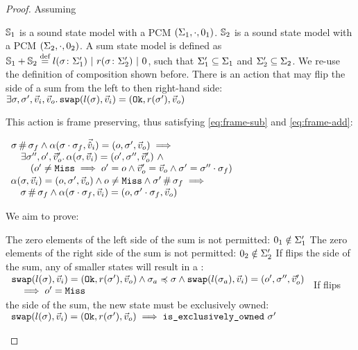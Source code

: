 \begin{proof}


Assuming 
\begin{hypvlist}
 $\mathbb S_1$ is a sound state model with a PCM $(\Sigma_1, \cdot, 0_1)$.
 $\mathbb S_2$ is a sound state model with a PCM $(\Sigma_2, \cdot, 0_2)$.
 A sum state model is defined as $\mathbb S_1 + \mathbb S_2 \stackrel{\textnormal{def}}= l(\sigma\colon \Sigma_1') ~|~ r(\sigma\colon \Sigma_2') ~|~ 0$, such that $\Sigma_1'\subseteq \Sigma_1$ and $\Sigma_2'\subseteq \Sigma_2$. We re-use the definition of composition shown before.
 There is an action \swap{} that may flip the side of a sum from the left to then right-hand side: $\exists\sigma,\sigma',\vec{v}_i,\vec{v}_o\ldotp \texttt{swap}(l(\sigma),\vec{v}_i)=(\texttt{Ok},r(\sigma'),\vec{v}_o)$
\end{hypvlist}

This \swap{} action is frame preserving, thus satisfying \ref{eq:frame-sub} and \ref{eq:frame-add}:
\begin{hypvlist}
	 $\begin{array}{l}
\sigma\operatorname{\#}\sigma_f \land \alpha(\sigma\cdot\sigma_f,\vec{\hat{v}}_i)=(o, \sigma',\vec{v}_o) \implies \\
\quad\exists \sigma'', o', \vec{v}_o'\ldotp \alpha(\sigma,\vec{v}_i)=(o', \sigma'', \vec{v}_o') ~\land \\
\qquad(o' \neq \texttt{Miss} \implies o' = o \land  \vec{v}_o' = \vec{v}_o \land \sigma' = \sigma'' \cdot \sigma_f)
	\end{array}$
	 $\begin{array}{l}
\alpha(\sigma,\vec{v}_i)=(o, \sigma', \vec{v}_o) \land o \neq \texttt{Miss} \land \sigma'\operatorname{\#}\sigma_f\implies\\
\quad\sigma \operatorname{\#} \sigma_f \land \alpha(\sigma\cdot\sigma_f, \vec{v}_i)=(o, \sigma'\cdot\sigma_f, \vec{v}_o)
	\end{array}$
\end{hypvlist}
	
We aim to prove:
\begin{goalvlist}
     The zero elements of the left side of the sum is not permitted: $0_1\notin \Sigma_1'$ 
     The zero elements of the right side of the sum is not permitted: $0_2\notin \Sigma_2'$ 
     If \swap{} flips the side of the sum, any \swap{} of smaller states will result in a \Miss: \\
    $\begin{array}{l}
    	\texttt{swap}(l(\sigma),\vec{v}_i)=(\texttt{Ok},r(\sigma'),\vec{v}_o)\land \sigma_a \preccurlyeq \sigma \land \texttt{swap}(l(\sigma_a),\vec{v}_i)=(o',\sigma'',\vec{v}_o') \\
    	\quad\implies o' = \texttt{Miss}
    \end{array}$
     If \swap{} flips the side of the sum, the new state must be exclusively owned:\\
    $\begin{array}{l}
    	\texttt{swap}(l(\sigma),\vec{v}_i)=(\texttt{Ok},r(\sigma'),\vec{v}_o) \implies \texttt{is\_exclusively\_owned}~\sigma'  
    \end{array}$
    

\end{goalvlist}
\end{proof}

